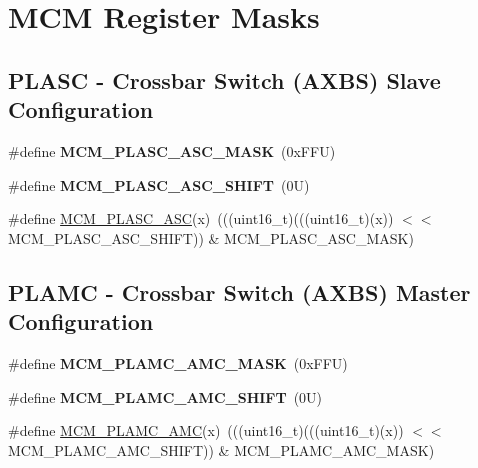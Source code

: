\hypertarget{group___m_c_m___register___masks}{}\section{M\+CM Register Masks}
\label{group___m_c_m___register___masks}
\subsection*{P\+L\+A\+SC -\/ Crossbar Switch (A\+X\+BS) Slave Configuration}
\begin{DoxyCompactItemize}
\item 
\mbox{\label{group___m_c_m___register___masks_ga215cf860c41174735020a34e7ccf9590}} 
\#define {\bfseries M\+C\+M\+\_\+\+P\+L\+A\+S\+C\+\_\+\+A\+S\+C\+\_\+\+M\+A\+SK}~(0x\+F\+F\+U)
\item 
\mbox{\label{group___m_c_m___register___masks_ga88f833168fd51e1b3c950e21b00bbfc3}} 
\#define {\bfseries M\+C\+M\+\_\+\+P\+L\+A\+S\+C\+\_\+\+A\+S\+C\+\_\+\+S\+H\+I\+FT}~(0\+U)
\item 
\#define \mbox{\hyperlink{group___m_c_m___register___masks_gaaae648a9e1b6e2e44af89bb3a6881a54}{M\+C\+M\+\_\+\+P\+L\+A\+S\+C\+\_\+\+A\+SC}}(x)~(((uint16\+\_\+t)(((uint16\+\_\+t)(x)) $<$$<$ M\+C\+M\+\_\+\+P\+L\+A\+S\+C\+\_\+\+A\+S\+C\+\_\+\+S\+H\+I\+FT)) \& M\+C\+M\+\_\+\+P\+L\+A\+S\+C\+\_\+\+A\+S\+C\+\_\+\+M\+A\+SK)
\end{DoxyCompactItemize}
\subsection*{P\+L\+A\+MC -\/ Crossbar Switch (A\+X\+BS) Master Configuration}
\begin{DoxyCompactItemize}
\item 
\mbox{\label{group___m_c_m___register___masks_ga7988227df54012705c7f522f348214ee}} 
\#define {\bfseries M\+C\+M\+\_\+\+P\+L\+A\+M\+C\+\_\+\+A\+M\+C\+\_\+\+M\+A\+SK}~(0x\+F\+F\+U)
\item 
\mbox{\label{group___m_c_m___register___masks_gaa1b3153d0bf749f80fffacd948dd4bd4}} 
\#define {\bfseries M\+C\+M\+\_\+\+P\+L\+A\+M\+C\+\_\+\+A\+M\+C\+\_\+\+S\+H\+I\+FT}~(0\+U)
\item 
\#define \mbox{\hyperlink{group___m_c_m___register___masks_gad8199ccd7b6edb29bcd5e940d17e7e47}{M\+C\+M\+\_\+\+P\+L\+A\+M\+C\+\_\+\+A\+MC}}(x)~(((uint16\+\_\+t)(((uint16\+\_\+t)(x)) $<$$<$ M\+C\+M\+\_\+\+P\+L\+A\+M\+C\+\_\+\+A\+M\+C\+\_\+\+S\+H\+I\+FT)) \& M\+C\+M\+\_\+\+P\+L\+A\+M\+C\+\_\+\+A\+M\+C\+\_\+\+M\+A\+SK)
\end{DoxyCompactItemize}
